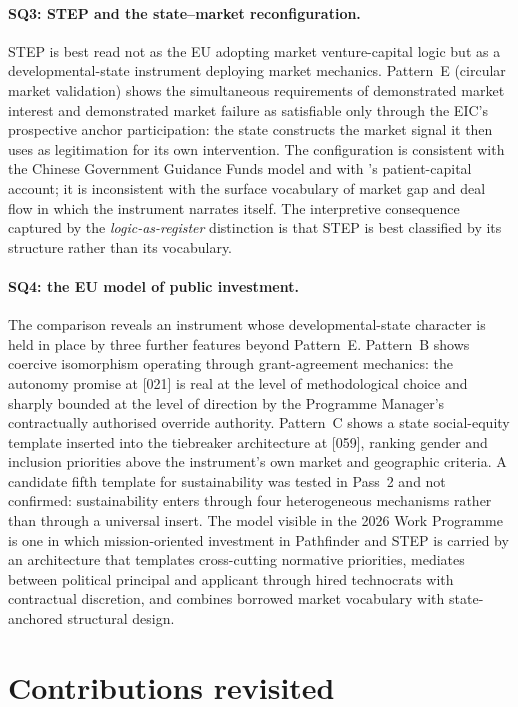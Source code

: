\paragraph{SQ3: STEP and the state--market reconfiguration.}
STEP is best read not as the EU adopting market venture-capital logic
but as a developmental-state instrument deploying market mechanics.
Pattern~E (circular market validation) shows the simultaneous
requirements of demonstrated market interest and demonstrated market
failure as satisfiable only through the EIC's prospective anchor
participation: the state constructs the market signal it then uses as
legitimation for its own intervention. The configuration is consistent
with the Chinese Government Guidance Funds model and with
\textcite{mazzucato2013entrepreneurial}'s patient-capital account; it is
inconsistent with the surface vocabulary of market gap and deal flow in
which the instrument narrates itself. The interpretive consequence
captured by the \emph{logic-as-register} distinction is that STEP is
best classified by its structure rather than its vocabulary.

\paragraph{SQ4: the EU model of public investment.}
The comparison reveals an instrument whose developmental-state
character is held in place by three further features beyond Pattern~E.
Pattern~B shows coercive isomorphism operating through grant-agreement
mechanics: the autonomy promise at [021] is real at the level of
methodological choice and sharply bounded at the level of direction by
the Programme Manager's contractually authorised override authority.
Pattern~C shows a state social-equity template inserted into the
tiebreaker architecture at [059], ranking gender and inclusion
priorities above the instrument's own market and geographic criteria.
A candidate fifth template for sustainability was tested in Pass~2 and
not confirmed: sustainability enters through four heterogeneous
mechanisms rather than through a universal insert. The model visible in
the 2026 Work Programme is one in which mission-oriented investment in
Pathfinder and STEP is carried by an architecture that templates
cross-cutting normative priorities, mediates between political
principal and applicant through hired technocrats with contractual
discretion, and combines borrowed market vocabulary with state-anchored
structural design.

\section{Contributions revisited}
\label{sec:conc-contrib}


